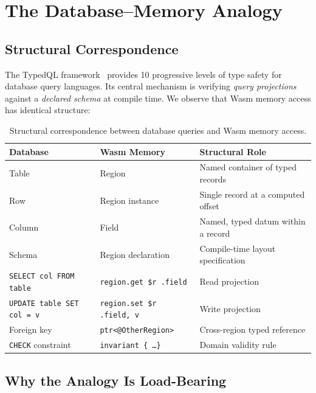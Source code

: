 \documentclass[sigplan,nonacm,screen]{acmart}
\begin{document}
\section{The Database--Memory Analogy}
\label{sec:analogy}

\subsection{Structural Correspondence}

The TypedQL framework~\cite{jewell2026} provides 10 progressive levels of
type safety for database query languages. Its central mechanism is
verifying \emph{query projections} against a \emph{declared schema} at
compile time. We observe that Wasm memory access has identical structure:

\begin{table}[ht]
\centering
\caption{Structural correspondence between database queries and Wasm memory access.}
\label{tab:analogy}
\begin{tabular}{@{}lll@{}}
\toprule
\textbf{Database} & \textbf{Wasm Memory} & \textbf{Structural Role} \\
\midrule
Table & Region & Named container of typed records \\
Row & Region instance & Single record at a computed offset \\
Column & Field & Named, typed datum within a record \\
Schema & Region declaration & Compile-time layout specification \\
\texttt{SELECT col FROM table} & \texttt{region.get \$r .field} & Read projection \\
\texttt{UPDATE table SET col = v} & \texttt{region.set \$r .field, v} & Write projection \\
Foreign key & \texttt{ptr<@OtherRegion>} & Cross-region typed reference \\
\texttt{CHECK} constraint & \texttt{invariant \{ \ldots \}} & Domain validity rule \\
\bottomrule
\end{tabular}
\end{table}

\subsection{Why the Analogy Is Load-Bearing}
\end{document}
